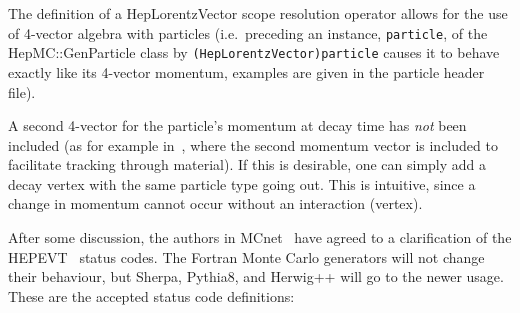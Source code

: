 \documentclass[11pt,letterpaper]{article}
\begin{document}
The definition of a HepLorentzVector scope resolution operator allows
for the use of 4-vector algebra with particles (i.e.\ preceding an
instance, \verb!particle!, of the HepMC::GenParticle class by
\verb!(HepLorentzVector)particle!  causes it to behave exactly like
its 4-vector momentum, examples are given in the particle header file).

A second 4-vector for the particle's momentum at decay time has 
{\it not} been included (as for example in~\cite{mc++}, where the
second momentum vector is included to facilitate tracking through
material). If this is desirable, one can simply add a decay vertex
with the same particle type going out. This is intuitive, since a
change in momentum cannot occur without an interaction (vertex).

After some discussion, the authors in MCnet~\cite{mcnet} have agreed to a 
clarification of the HEPEVT~\cite{stdhep5.05} status codes. 
The Fortran Monte Carlo generators will not change their behaviour, 
but Sherpa, Pythia8, and Herwig++ will go to the newer usage.\newline
These are the accepted status code definitions:
\begin{myitemize}{}
\end{myitemize}


%
%
\end{document}
